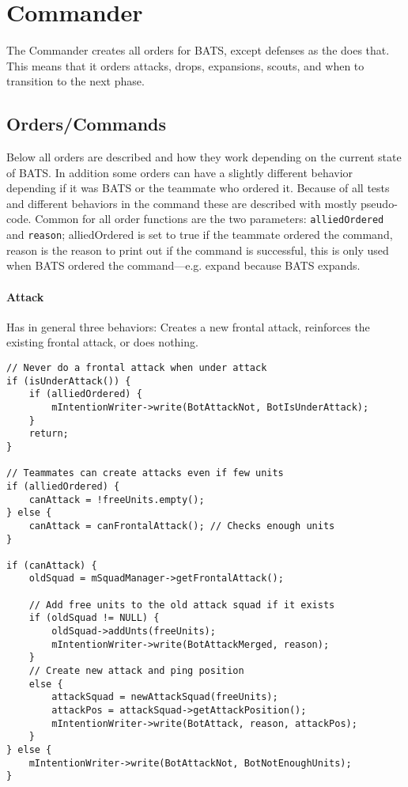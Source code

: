 \section{Commander}
The Commander creates all orders for BATS, except defenses as the  does that. This means that it orders attacks, drops, expansions, scouts, and when to transition to the next phase.

\subsection{Orders/Commands}
Below all orders are described and how they work depending on the current state of BATS. In addition some orders can have a slightly different behavior depending if it was BATS or the teammate who ordered it. Because of all tests and different behaviors in the command these are described with mostly pseudo-code. Common for all order functions are the two parameters: \texttt{alliedOrdered} and \texttt{reason}; alliedOrdered is set to true if the teammate ordered the command, reason is the reason to print out if the command is successful, this is only used when BATS ordered the command—e.g. expand because BATS expands.

\paragraph{Attack}
Has in general three behaviors: Creates a new frontal attack, reinforces the existing frontal attack, or does nothing.
\begin{lstlisting}[label={lst:order_attack},caption={Pseudo-code of the attack command}]
// Never do a frontal attack when under attack
if (isUnderAttack()) {
	if (alliedOrdered) {
		mIntentionWriter->write(BotAttackNot, BotIsUnderAttack);
	}
	return;
}

// Teammates can create attacks even if few units
if (alliedOrdered) {
	canAttack = !freeUnits.empty();
} else {
	canAttack = canFrontalAttack(); // Checks enough units
}

if (canAttack) {
	oldSquad = mSquadManager->getFrontalAttack();
	
	// Add free units to the old attack squad if it exists
	if (oldSquad != NULL) {
		oldSquad->addUnts(freeUnits);
		mIntentionWriter->write(BotAttackMerged, reason);
	}
	// Create new attack and ping position
	else {
		attackSquad = newAttackSquad(freeUnits);
		attackPos = attackSquad->getAttackPosition();
		mIntentionWriter->write(BotAttack, reason, attackPos);
	}
} else {
	mIntentionWriter->write(BotAttackNot, BotNotEnoughUnits);
}
\end{lstlisting}

